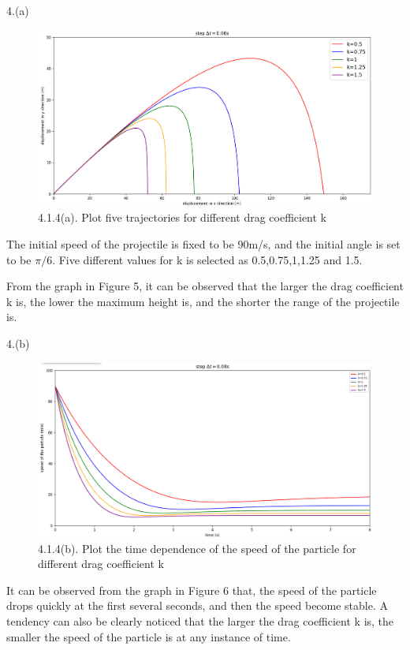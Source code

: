 \documentclass{book}
\begin{document}
\vspace{0.03\textheight}
{\Large 4.(a)}
\begin{figure}[H]
  \centering
  \includegraphics[scale=0.4]{./graphs/project4.1.4(a).png}
  \caption{4.1.4(a). Plot five trajectories for different drag coefficient k}
\end{figure}
\vspace{0.01\textheight}
The initial speed of the projectile is fixed to be 90m/s, and the initial angle is set to be $\pi/6$. Five different values for k is selected as 0.5,0.75,1,1.25 and 1.5.

From the graph in Figure 5, it can be observed that the larger the drag coefficient k is, the lower the maximum height is, and the shorter the range of the projectile is.

  {\Large 4.(b)}

\begin{figure}[H]
  \centering
  \includegraphics[scale=0.4]{./graphs/project4.1.4(b).png}
  \caption{4.1.4(b). Plot the time dependence of the speed of the particle for different drag coefficient k}
\end{figure}

It can be observed from the graph in Figure 6 that, the speed of the particle drops quickly at the first several seconds, and then the speed become stable.
A tendency can also be clearly noticed that the larger the drag coefficient k is, the smaller the speed of the particle is at any instance of time.
\end{document}
